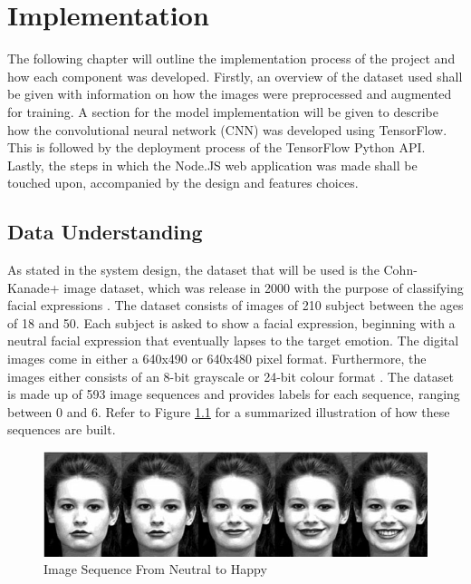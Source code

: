 \chapter{Implementation}
The following chapter will outline the implementation process of the project and how each component was developed. Firstly, an overview of the dataset used shall be given with information on how the images were preprocessed and augmented for training. A section for the model implementation will be given to describe how the convolutional neural network (CNN) was developed using TensorFlow. This is followed by the deployment process of the TensorFlow Python API. Lastly, the steps in which the Node.JS web application was made shall be touched upon, accompanied by the design and features choices.

\section{Data Understanding}
As stated in the system design, the dataset that will be used is the Cohn-Kanade+ image dataset, which was release in 2000 with the purpose of classifying facial expressions \citep{ck}. The dataset consists of images of 210 subject between the ages of 18 and 50. Each subject is asked to show a facial expression, beginning with a neutral facial expression that eventually lapses to the target emotion. The digital images come in either a 640x490 or 640x480 pixel format. Furthermore, the images either consists of an 8-bit grayscale or 24-bit colour format \citep{ck}. The dataset is made up of 593 image sequences and provides labels for each sequence, ranging between 0 and 6. Refer to Figure \ref{seq} for a summarized illustration of how these sequences are built.

\begin{figure}[ht]
	\begin{center}
		\advance\leftskip-3cm
		\advance\rightskip-3cm
		\includegraphics[keepaspectratio=true,scale=0.6]{__resources/DATASET/sequence.png}
		\caption{Image Sequence From Neutral to Happy}
		\label{seq}
	\end{center}
\end{figure}

